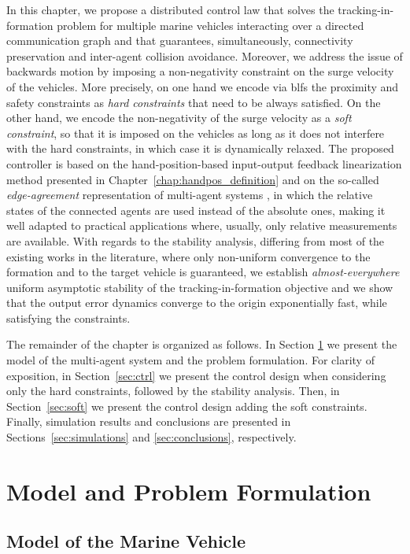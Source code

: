 In this chapter, we propose a distributed control law that solves the tracking-in-formation problem for multiple marine vehicles interacting over a directed communication graph and that guarantees, simultaneously, connectivity preservation and inter-agent collision avoidance.
Moreover, we address the issue of backwards motion by imposing a non-negativity constraint on the surge velocity of the vehicles.
More precisely, on one hand we encode via \glspl{blf} the proximity and safety constraints as \emph{hard constraints} that need to be always satisfied.
On the other hand, we encode the non-negativity of the surge velocity as a \emph{soft constraint}, so that it is imposed on the vehicles as long as it does not interfere with the hard constraints, in which case it is dynamically relaxed.
The proposed controller is based on the hand-position-based input-output feedback linearization method presented in Chapter~\ref{chap:handpos_definition} and on the so-called \emph{edge-agreement} representation of multi-agent systems \cite{mesbahi_graph_2010}, in which the relative states of the connected agents are used instead of the absolute ones, making it well adapted to practical applications where, usually, only relative measurements are available.
With regards to the stability analysis, differing from most of the existing works in the literature, where only non-uniform convergence to the formation and to the target vehicle is guaranteed, we establish \emph{almost-everywhere} uniform asymptotic stability of the tracking-in-formation objective and we show that the output error dynamics converge to the origin exponentially fast, while satisfying the constraints.

The remainder of the chapter is organized as follows.
In Section \ref{sec:preliminaries} we present the model of the multi-agent system and the problem formulation. For clarity of exposition, in Section~\ref{sec:ctrl} we present the control design when considering only the hard constraints, followed by the stability analysis. Then, in Section~\ref{sec:soft} we present the control design adding the soft constraints. Finally, simulation results and conclusions are presented in Sections~\ref{sec:simulations} and \ref{sec:conclusions}, respectively.

\section{Model and Problem Formulation}\label{sec:preliminaries}

\subsection{Model of the Marine Vehicle}

